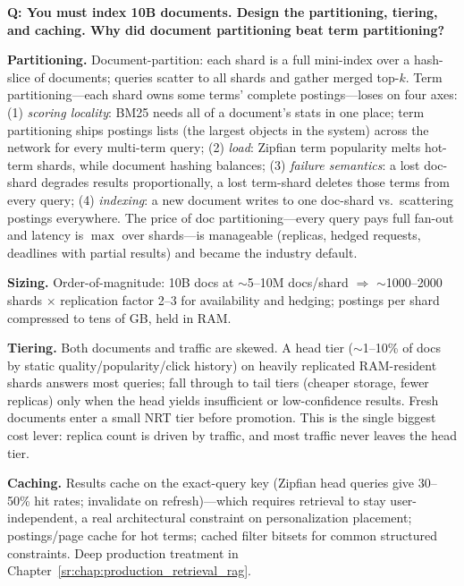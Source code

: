 \begin{interviewq}
\textbf{Q: You must index 10B documents. Design the partitioning, tiering, and caching. Why did document partitioning beat term partitioning?}

 \quad {} \quad \badgefreq{\freqmed}

\stronganswer

\textbf{Partitioning.} Document-partition: each shard is a full mini-index over a hash-slice of documents; queries scatter to all shards and gather merged top-$k$. Term partitioning---each shard owns some terms' complete postings---loses on four axes: (1) \emph{scoring locality}: BM25 needs all of a document's stats in one place; term partitioning ships postings lists (the largest objects in the system) across the network for every multi-term query; (2) \emph{load}: Zipfian term popularity melts hot-term shards, while document hashing balances; (3) \emph{failure semantics}: a lost doc-shard degrades results proportionally, a lost term-shard deletes those terms from every query; (4) \emph{indexing}: a new document writes to one doc-shard vs.\ scattering postings everywhere. The price of doc partitioning---every query pays full fan-out and latency is $\max$ over shards---is manageable (replicas, hedged requests, deadlines with partial results) and became the industry default.

\textbf{Sizing.} Order-of-magnitude: 10B docs at $\sim$5--10M docs/shard $\Rightarrow$ $\sim$1000--2000 shards $\times$ replication factor 2--3 for availability and hedging; postings per shard compressed to tens of GB, held in RAM.

\textbf{Tiering.} Both documents and traffic are skewed. A head tier ($\sim$1--10\% of docs by static quality/popularity/click history) on heavily replicated RAM-resident shards answers most queries; fall through to tail tiers (cheaper storage, fewer replicas) only when the head yields insufficient or low-confidence results. Fresh documents enter a small NRT tier before promotion. This is the single biggest cost lever: replica count is driven by traffic, and most traffic never leaves the head tier.

\textbf{Caching.} Results cache on the exact-query key (Zipfian head queries give 30--50\% hit rates; invalidate on refresh)---which requires retrieval to stay user-independent, a real architectural constraint on personalization placement; postings/page cache for hot terms; cached filter bitsets for common structured constraints. Deep production treatment in Chapter~\ref{sr:chap:production_retrieval_rag}.


\end{interviewq}
